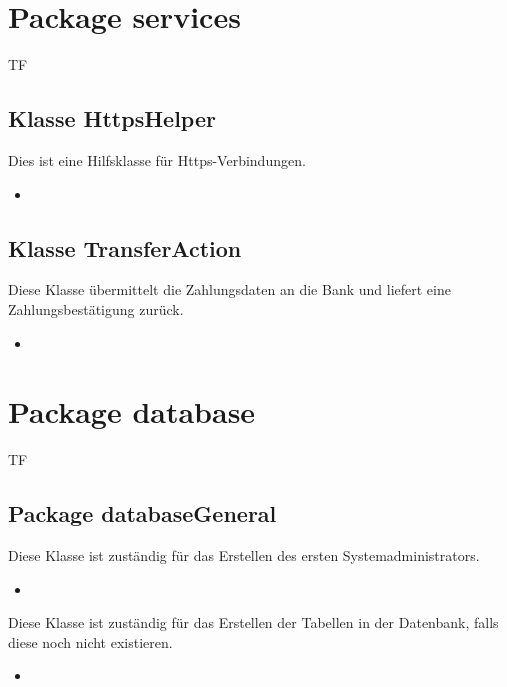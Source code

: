 	\section{Package services}
	\begin{tiny}
		TF
	\end{tiny}
	\subsection{Klasse HttpsHelper}
	Dies ist eine Hilfsklasse für Https-Verbindungen.
	\begin{itemize}
		\item {}
	\end{itemize}
	
	\subsection{Klasse TransferAction}
	Diese Klasse übermittelt die Zahlungsdaten an die Bank und liefert eine Zahlungsbestätigung
	zurück.
	\begin{itemize}
		\item {}
	\end{itemize}
	
	
	
	\section{Package database}
	\begin{tiny}
		TF
	\end{tiny}
	\subsection{Package databaseGeneral}
	
	Diese Klasse ist zuständig für das Erstellen des ersten Systemadministrators.
	\begin{itemize}
		\item {}
	\end{itemize}
	
	Diese Klasse ist zuständig für das Erstellen der Tabellen in der Datenbank, falls diese noch nicht existieren.
	\begin{itemize}
		\item {}
	\end{itemize}
	
